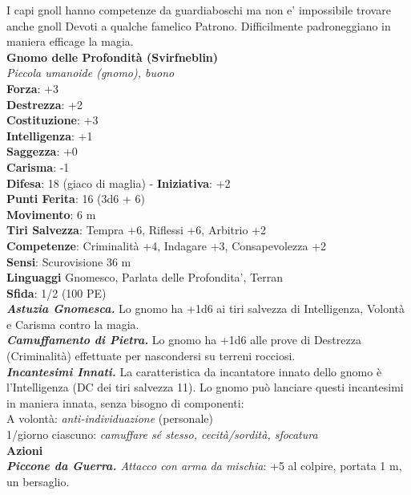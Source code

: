 \begin{multicols}{2}
I capi gnoll hanno competenze da guardiaboschi ma non e' impossibile trovare anche gnoll Devoti a qualche famelico Patrono. Difficilmente padroneggiano in maniera efficage la magia.\\


\medskip\textbf{Gnomo delle Profondità (Svirfneblin)} \\
\emph{Piccola umanoide (gnomo), buono}\\
\textbf{Forza}: +3\\
\textbf{Destrezza}: +2\\
\textbf{Costituzione}: +3\\
\textbf{Intelligenza}: +1\\
\textbf{Saggezza}: +0\\
\textbf{Carisma}: -1\\
\textbf{Difesa}: 18 (giaco di maglia) - \textbf{Iniziativa}: +2\\
\textbf{Punti Ferita}: 16 (3d6 + 6)\\
\textbf{Movimento}: 6 m\\
\textbf{Tiri Salvezza}: Tempra +6, Riflessi +6, Arbitrio +2\\
\textbf{Competenze}: Criminalità +4, Indagare +3, Consapevolezza +2\\
\textbf{Sensi}: Scurovisione 36 m\\
\textbf{Linguaggi} Gnomesco, Parlata delle Profondita', Terran\\
\textbf{Sfida}: 1/2 (100 PE)\smallskip\\
\emph{\textbf{Astuzia Gnomesca.}} Lo gnomo ha +1d6 ai tiri salvezza di Intelligenza, Volontà e Carisma contro la magia.\\
\emph{\textbf{Camuffamento di Pietra.}} Lo gnomo ha +1d6 alle prove di Destrezza (Criminalità) effettuate per nascondersi su terreni rocciosi.\\
\emph{\textbf{Incantesimi Innati.}} La caratteristica da incantatore innato dello gnomo è l'Intelligenza (DC dei tiri salvezza 11). Lo gnomo può lanciare questi incantesimi in maniera innata, senza bisogno di componenti:\\
A volontà: \emph{anti-individuazione} (personale)\\
1/giorno ciascuno: \emph{camuffare sé stesso, cecità/sordità, sfocatura}\\
\smallskip\textbf{Azioni}\\
\emph{\textbf{Piccone da Guerra.} Attacco con arma da mischia}: +5 al colpire, portata 1 m, un bersaglio.\\

\end{multicols}
